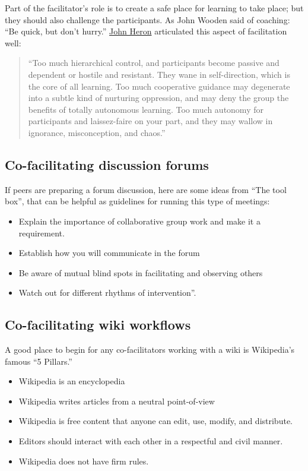 Part of the facilitator's role is to create a safe place for learning to
take place; but they should also challenge the participants. As John
Wooden said of coaching: ``Be quick, but don't hurry.''
\href{http://en.wikipedia.org/wiki/John\_Heron}{John Heron} articulated
this aspect of facilitation well:

\begin{quote}
``Too much hierarchical control, and participants become passive and
dependent or hostile and resistant. They wane in self-direction, which
is the core of all learning. Too much cooperative guidance may
degenerate into a subtle kind of nurturing oppression, and may deny the
group the benefits of totally autonomous learning. Too much autonomy for
participants and laissez-faire on your part, and they may wallow in
ignorance, misconception, and chaos.''
\end{quote}
\subsection{Co-facilitating discussion forums}

If peers are preparing a forum discussion, here are some ideas from
``The tool box'', that can be helpful as guidelines for running this
type of meetings:

\begin{itemize}
\item
  Explain the importance of collaborative group work and make it a
  requirement.
\item
  Establish how you will communicate in the forum
\item
  Be aware of mutual blind spots in facilitating and observing others
\item
  Watch out for different rhythms of intervention''.
\end{itemize}
\subsection{Co-facilitating wiki workflows}

A good place to begin for any co-facilitators working with a wiki is
Wikipedia's famous ``5 Pillars.''

\begin{itemize}
\item
  Wikipedia is an encyclopedia
\item
  Wikipedia writes articles from a neutral point-of-view
\item
  Wikipedia is free content that anyone can edit, use, modify, and
  distribute.
\item
  Editors should interact with each other in a respectful and civil
  manner.
\item
  Wikipedia does not have firm rules.
\end{itemize}
